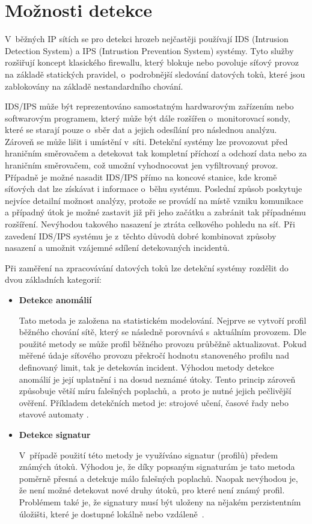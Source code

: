  \newpage
 \section{Možnosti detekce}
 V~běžných IP sítích se pro detekci hrozeb nejčastěji používají IDS (Intrusion Detection System) a
 IPS (Intrustion Prevention System) systémy. Tyto služby rozšiřují koncept klasického firewallu, který
 blokuje nebo povoluje síťový provoz na základě statických pravidel, o~podrobnější sledování 
 datových toků, které jsou zablokovány na základě nestandardního chování.
 
 IDS/IPS může být reprezentováno samostatným hardwarovým zařízením nebo softwarovým programem, který
 může být dále rozšířen o~monitorovací sondy, které se starají pouze o~sběr dat a jejich odesílání
 pro následnou analýzu. Zároveň
 se může lišit i umístění v~síti. Detekční systémy lze provozovat před hraničním směrovačem 
 a detekovat tak kompletní příchozí a odchozí data nebo za hraničním směrovačem, což 
 umožní vyhodnocovat jen vyfiltrovaný provoz. Případně je možné nasadit IDS/IPS přímo na koncové
 stanice, kde kromě síťových dat lze získávat i informace o~běhu systému. Poslední způsob poskytuje
 nejvíce detailní možnost analýzy, protože se provádí na místě vzniku komunikace a případný útok
 je možné zastavit již při jeho začátku a zabránit tak případnému rozšíření. Nevýhodou takového nasazení
 je ztráta celkového pohledu na síť. Při zavedení IDS/IPS systému je z~těchto důvodů dobré 
 kombinovat způsoby nasazení a umožnit vzájemné sdílení detekovaných incidentů.
 
 Při zaměření na zpracovávání datových toků lze detekční systémy rozdělit do dvou základních kategorií:
 \begin{itemize}
  \item \textbf{Detekce anomálií}
  
  Tato metoda je založena na statistickém modelování. Nejprve se vytvoří profil běžného chování sítě, 
  který se následně porovnává s~aktuálním provozem. Dle použité metody se může profil běžného provozu
  průběžně aktualizovat. Pokud měřené údaje síťového provozu překročí hodnotu stanoveného profilu
  nad definovaný limit, tak je detekován incident. Výhodou metody detekce anomálií je její uplatnění i na 
  dosud neznámé útoky. Tento princip zároveň způsobuje větší míru falešných poplachů, a~proto 
  je nutné jejich pečlivější ověření. Příkladem detekčních metod je: strojové učení, časové řady nebo
  stavové automaty \cite{ids-ips}.
  
  \item \textbf{Detekce signatur}
  
  V~případě použití této metody je využíváno signatur (profilů) předem známých útoků. Výhodou je, že díky 
  popsaným signaturám je tato metoda poměrně přesná a detekuje málo falešných poplachů. Naopak
  nevýhodou je, že není možné detekovat nové druhy útoků, pro které není známý profil. Problémem
  také je, že signatury musí být uloženy na nějakém perzistentním úložišti, které je dostupné 
  lokálně nebo vzdáleně~\cite{ids-ips}.
 \end{itemize}
 
